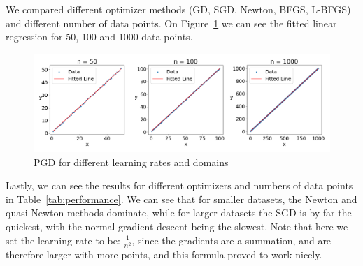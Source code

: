 \documentclass[9pt]{IEEEtran}
\begin{document}
 We compared  different 
optimizer methods (GD, SGD, Newton, BFGS, L-BFGS) and different number of data points. 
On Figure~\ref{fig:lin} we can see the fitted linear regression for 50, 100 and 
1000 data points. 
    
    \begin{figure}[h]
        \centering
        \includegraphics[width=0.99\columnwidth]{figures/lin.png}
        \caption{PGD for different learning rates and domains}
        \label{fig:lin}
    \end{figure}

Lastly, we can see the results for different optimizers and numbers of data points in Table~\ref{tab:performance}.
We can see that for smaller datasets, the Newton and quasi-Newton methods dominate, while 
for larger datasets the SGD is by far the quickest, with the normal gradient descent being the slowest.
Note that here we set the learning rate to be: 
$\frac{1}{n^2}$, since the gradients are a summation, and are therefore larger with more points, and this 
formula proved to work nicely.
\end{document}

